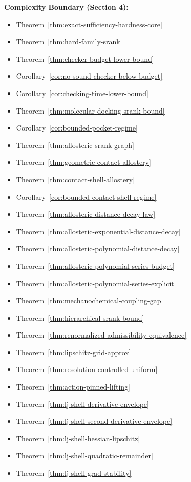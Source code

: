 \textbf{Complexity Boundary (Section 4):}
\begin{itemize}
\item Theorem~\ref{thm:exact-sufficiency-hardness-core}
\item Theorem~\ref{thm:hard-family-srank}
\item Theorem~\ref{thm:checker-budget-lower-bound}
\item Corollary~\ref{cor:no-sound-checker-below-budget}
\item Corollary~\ref{cor:checking-time-lower-bound}
\item Theorem~\ref{thm:molecular-docking-srank-bound}
\item Corollary~\ref{cor:bounded-pocket-regime}
\item Theorem~\ref{thm:allosteric-srank-graph}
\item Theorem~\ref{thm:geometric-contact-allostery}
\item Theorem~\ref{thm:contact-shell-allostery}
\item Corollary~\ref{cor:bounded-contact-shell-regime}
\item Theorem~\ref{thm:allosteric-distance-decay-law}
\item Theorem~\ref{thm:allosteric-exponential-distance-decay}
\item Theorem~\ref{thm:allosteric-polynomial-distance-decay}
\item Theorem~\ref{thm:allosteric-polynomial-series-budget}
\item Theorem~\ref{thm:allosteric-polynomial-series-explicit}
\item Theorem~\ref{thm:mechanochemical-coupling-gap}
\item Theorem~\ref{thm:hierarchical-srank-bound}
\item Theorem~\ref{thm:renormalized-admissibility-equivalence}
\item Theorem~\ref{thm:lipschitz-grid-approx}
\item Theorem~\ref{thm:resolution-controlled-uniform}
\item Theorem~\ref{thm:action-pinned-lifting}
\item Theorem~\ref{thm:lj-shell-derivative-envelope}
\item Theorem~\ref{thm:lj-shell-second-derivative-envelope}
\item Theorem~\ref{thm:lj-shell-hessian-lipschitz}
\item Theorem~\ref{thm:lj-shell-quadratic-remainder}
\item Theorem~\ref{thm:lj-shell-grad-stability}

\end{itemize}
